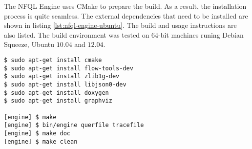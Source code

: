 The \ac{NFQL} Engine uses CMake to prepare the build. As a result, the
installation process is quite seamless.  The external dependencies that need
  to be installed are shown in listing
\ref{lst:nfql-engine-ubuntu}. The build and usage instructions are also
listed. The build environment was tested on $64$-bit machines runing Debian
Squeeze, Ubuntu $10.04$ and $12.04$.

\begin{lstlisting}
$ sudo apt-get install cmake
$ sudo apt-get install flow-tools-dev
$ sudo apt-get install zlib1g-dev
$ sudo apt-get install libjson0-dev
$ sudo apt-get install doxygen
$ sudo apt-get install graphviz

[engine] $ make
[engine] $ bin/engine querfile tracefile
[engine] $ make doc
[engine] $ make clean
\end{lstlisting}
